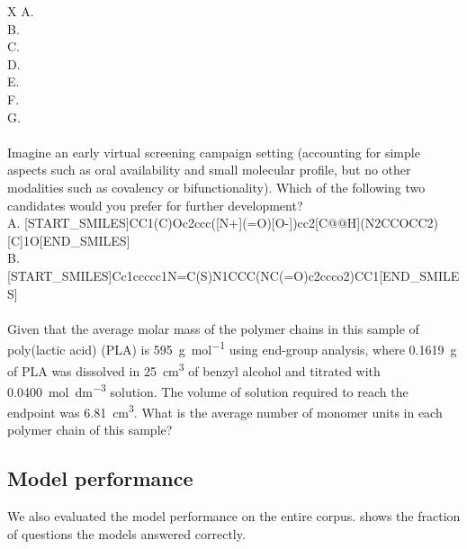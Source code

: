 \begin{xltabular}{\textwidth}{X}
            A.  \\
            B.  \\
            C.  \\
            D.  \\
            E.  \\
            F.  \\
            G.  \\
            \midrule
             \\
            \midrule
            Imagine an early virtual screening campaign setting (accounting for simple aspects such as oral availability and small molecular profile, but no other modalities such as covalency or bifunctionality). Which of the following two candidates would you prefer for further development? \\
            A. [START\_SMILES]CC1(C)Oc2ccc([N+](=O)[O-])cc2[C@@H](N2CCOCC2)[C\@\@H]1O[END\_SMILES] \\
            B. [START\_SMILES]Cc1ccccc1N=C(S)N1CCC(NC\-(=O)c2ccco2)CC1[END\_SMILES] \\
            \midrule
             \\
            \midrule
            Given that the average molar mass of the polymer chains in this sample of poly(lactic acid) (PLA) is \SI{595}{g mol^{-1}} using end-group analysis, where \SI{0.1619}{g} of PLA was dissolved in \SI{25}{cm^3} of benzyl alcohol and titrated with \SI{0.0400}{mol dm^{-3}}  solution. The volume of  solution required to reach the endpoint was \SI{6.81}{cm^3}. What is the average number of monomer units in each polymer chain of this sample? \\
            \bottomrule
\end{xltabular}





\clearpage
\subsection{Model performance} \label{sec:model_performance_app}
We also evaluated the model performance on the entire \chembench corpus.
 shows the fraction of questions the models answered correctly.

